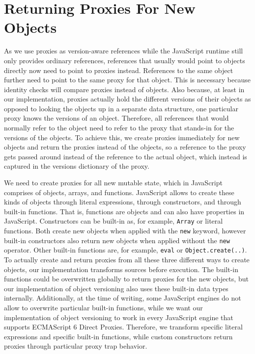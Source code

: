 \section{Returning Proxies For New Objects}

As we use proxies as version-aware references while the JavaScript runtime still only provides ordinary references, references that usually would point to objects directly now need to point to proxies instead. 
References to the same object further need to point to the same proxy for that object.
This is necessary because identity checks will compare proxies instead of objects.
Also because, at least in our implementation, proxies actually hold the different versions of their objects as opposed to looking the objects up in a separate data structure, one particular proxy knows the versions of an object.
Therefore, all references that would normally refer to the object need to refer to the proxy that stands-in for the versions of the objects.
To achieve this, we create proxies immediately for new objects and return the proxies instead of the objects, so a reference to the proxy gets passed around instead of the reference to the actual object, which instead is captured in the versions dictionary of the proxy.

We need to create proxies for all new mutable state, which in JavaScript comprises of objects, arrays, and functions.
JavaScript allows to create these kinds of objects through literal expressions, through constructors, and through built-in functions.
That is, functions are objects and can also have properties in JavaScript.
Constructors can be built-in as, for example, \lstinline{Array} or literal functions.
Both create new objects when applied with the \lstinline{new} keyword, however built-in constructors also return new objects when applied without the \lstinline{new} operator.
Other built-in functions are, for example, \lstinline{eval} or \lstinline{Object.create(..)}.
To actually create and return proxies from all these three different ways to create objects, our implementation transforms sources before execution.
The built-in functions could be overwritten globally to return proxies for the new objects, but our implementation of object versioning also uses these built-in data types internally.
Additionally, at the time of writing, some JavaScript engines do not allow to overwrite particular built-in functions, while we want our implementation of object versioning to work in every JavaScript engine that supports ECMAScript 6 Direct Proxies.
Therefore, we transform specific literal expressions and specific built-in functions, while custom constructors return proxies through particular proxy trap behavior.

